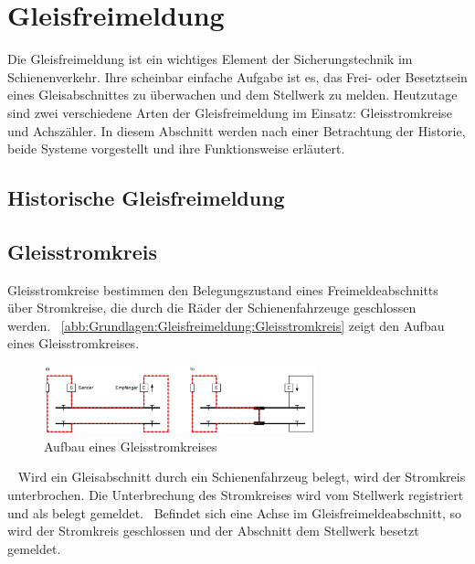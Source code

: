 \section{Gleisfreimeldung}\label{text:Grundlagen:Gleisfreimeldung}

Die Gleisfreimeldung ist ein wichtiges Element der Sicherungstechnik im Schienenverkehr. Ihre scheinbar einfache Aufgabe ist es, das Frei- oder Besetztsein eines Gleisabschnittes zu überwachen und dem Stellwerk zu melden. Heutzutage sind zwei verschiedene Arten der Gleisfreimeldung im Einsatz: Gleisstromkreise und Achszähler. In diesem Abschnitt werden nach einer Betrachtung der Historie, beide Systeme vorgestellt und ihre Funktionsweise erläutert.

\subsection{Historische Gleisfreimeldung}\label{text:Grundlagen:Gleisfreimeldung:Historische-Gleisfreimeldung}

\subsection{Gleisstromkreis}\label{text:Grundlagen:Gleisfreimeldung:Gleisstromkreis}

Gleisstromkreise bestimmen den Belegungszustand eines Freimeldeabschnitts über Stromkreise, die durch die Räder der Schienenfahrzeuge geschlossen werden.~\cite[][S. 47]{bib:Sicherung-des-Schienenverkehrs} \autoref{abb:Grundlagen:Gleisfreimeldung:Gleisstromkreis} zeigt den Aufbau eines Gleisstromkreises.

\begin{figure}[H]
    \centering
    \includegraphics[width=0.7\textwidth]{Assets/Images/2-Grundlagen/Gleisstromkreis.png}
    \caption{Aufbau eines Gleisstromkreises~\cite[][S. 47]{bib:Sicherung-des-Schienenverkehrs}}\label{abb:Grundlagen:Gleisfreimeldung:Gleisstromkreis}
\end{figure}

~\cite[][S. 47]{bib:Sicherung-des-Schienenverkehrs} Wird ein Gleisabschnitt durch ein Schienenfahrzeug belegt, wird der Stromkreis unterbrochen. Die Unterbrechung des Stromkreises wird vom Stellwerk registriert und als belegt gemeldet.~\cite[][S. 47]{bib:Sicherung-des-Schienenverkehrs} Befindet sich eine Achse im Gleisfreimeldeabschnitt, so wird der Stromkreis geschlossen und der Abschnitt dem Stellwerk besetzt gemeldet.~\cite[][S. 47]{bib:Sicherung-des-Schienenverkehrs}

